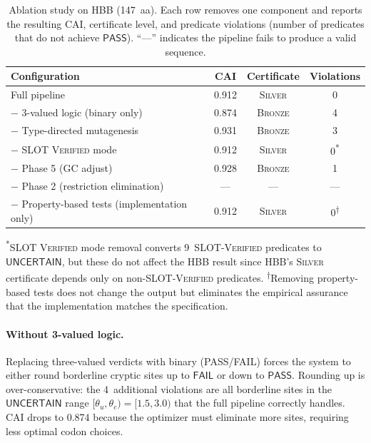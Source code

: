 \documentclass[acmsmall,review,anonymous]{acmart}
\newcommand{\PASS}{\ensuremath{\mathsf{PASS}}\xspace}
\newcommand{\FAIL}{\ensuremath{\mathsf{FAIL}}\xspace}
\newcommand{\UNCERTAIN}{\ensuremath{\mathsf{UNCERTAIN}}\xspace}
\newcommand{\SILVER}{\textsc{Silver}\xspace}
\newcommand{\BRONZE}{\textsc{Bronze}\xspace}
\begin{document}
\begin{table}[t]
\centering
\caption{Ablation study on HBB (147~aa).  Each row removes one
         component and reports the resulting CAI, certificate level,
         and predicate violations (number of predicates that do not
         achieve \PASS).  ``---'' indicates the pipeline fails to
         produce a valid sequence.}
\label{tab:ablation}
\begin{tabular}{lccc}
\toprule
\textbf{Configuration} & \textbf{CAI} & \textbf{Certificate} &
  \textbf{Violations} \\
\midrule
Full pipeline                              & 0.912 & \SILVER & 0 \\
\quad$-$ 3-valued logic (binary only)      & 0.874 & \BRONZE & 4 \\
\quad$-$ Type-directed mutagenesis         & 0.931 & \BRONZE & 3 \\
\quad$-$ SLOT \textsc{Verified} mode       & 0.912 & \SILVER & 0\textsuperscript{*} \\
\quad$-$ Phase 5 (GC adjust)               & 0.928 & \BRONZE & 1 \\
\quad$-$ Phase 2 (restriction elimination) & ---   & ---     & --- \\
\quad$-$ Property-based tests (implementation only) & 0.912 & \SILVER & 0\textsuperscript{$\dagger$} \\
\bottomrule
\end{tabular}
\vspace{2pt}

{\scriptsize \textsuperscript{*}SLOT \textsc{Verified} mode removal
converts 9~SLOT-\textsc{Verified} predicates to \UNCERTAIN, but these
do not affect the HBB result since HBB's \SILVER{} certificate depends
only on non-SLOT-\textsc{Verified} predicates.
\textsuperscript{$\dagger$}Removing property-based tests does not
change the output but eliminates the empirical assurance that the
implementation matches the specification.}
\end{table}

\paragraph{Without 3-valued logic.}
Replacing three-valued verdicts with binary (PASS/FAIL) forces the
system to either round borderline cryptic sites up to \FAIL{} or down to
\PASS{}.  Rounding up is over-conservative: the 4~additional violations
are all borderline sites in the \UNCERTAIN{} range
$[\theta_u, \theta_c) = [1.5, 3.0)$ that the full pipeline correctly
handles.  CAI drops to 0.874 because the optimizer must eliminate more
sites, requiring less optimal codon choices.
\end{document}
